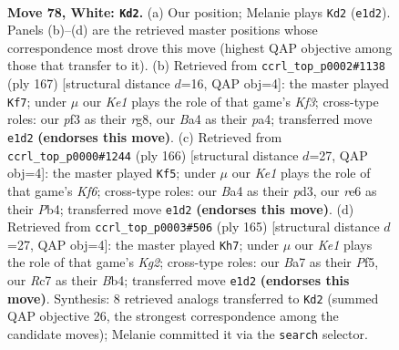 \documentclass[11pt]{article}
\begin{document}
\clearpage

\begin{figure}[p]\centering
\begin{subfigure}{0.46\textwidth}\centering
\resizebox{\linewidth}{!}{%
\newchessgame
\chessboard[
  setfen={7k/B1R5/4r3/8/B3p2p/5p1P/b4P2/4K3 w - - 66 78},
  showmover=false,
  pgfstyle=straightmove, color=movearrow, markmove={e1-d2}
]}
\caption{}
\end{subfigure}\hfill
\begin{subfigure}{0.46\textwidth}\centering
\resizebox{\linewidth}{!}{%
\newchessgame
\chessboard[
  setfen={6R1/8/1K3k2/p4p2/Pb1r4/5B1P/6P1/8 b - - 70 84},
  showmover=false,
  pgfstyle=straightmove, color=movearrow, markmove={f6-f7}
]}
\caption{}
\end{subfigure}
\\[4pt]
\begin{subfigure}{0.46\textwidth}\centering
\resizebox{\linewidth}{!}{%
\newchessgame
\chessboard[
  setfen={8/4P3/p4K2/Pp1k3b/1P6/3p4/3B4/8 w - - 6 84},
  showmover=false,
  pgfstyle=straightmove, color=movearrow, markmove={f6-f5}
]}
\caption{}
\end{subfigure}\hfill
\begin{subfigure}{0.46\textwidth}\centering
\resizebox{\linewidth}{!}{%
\newchessgame
\chessboard[
  setfen={8/5pk1/8/5p1p/1b3P1P/1P4P1/4K1B1/8 b - - 30 83},
  showmover=false,
  pgfstyle=straightmove, color=movearrow, markmove={g7-h7}
]}
\caption{}
\end{subfigure}
\caption{\textbf{Move 78, White: \texttt{Kd2}.} (a) Our position; Melanie plays \texttt{Kd2} (\texttt{e1d2}). Panels (b)--(d) are the retrieved master positions whose correspondence most drove this move (highest QAP objective among those that transfer to it). (b) Retrieved from \texttt{ccrl\_top\_p0002\#1138} (ply 167) [structural distance $d$=16, QAP obj=4]: the master played \texttt{Kf7}; under $\mu$ our \emph{Ke1} plays the role of that game's \emph{Kf3}; cross-type roles: our \emph{p}f3 as their \emph{r}g8, our \emph{B}a4 as their \emph{p}a4; transferred move \texttt{e1d2} \textbf{(endorses this move)}. (c) Retrieved from \texttt{ccrl\_top\_p0000\#1244} (ply 166) [structural distance $d$=27, QAP obj=4]: the master played \texttt{Kf5}; under $\mu$ our \emph{Ke1} plays the role of that game's \emph{Kf6}; cross-type roles: our \emph{B}a4 as their \emph{p}d3, our \emph{r}e6 as their \emph{P}b4; transferred move \texttt{e1d2} \textbf{(endorses this move)}. (d) Retrieved from \texttt{ccrl\_top\_p0003\#506} (ply 165) [structural distance $d$=27, QAP obj=4]: the master played \texttt{Kh7}; under $\mu$ our \emph{Ke1} plays the role of that game's \emph{Kg2}; cross-type roles: our \emph{B}a7 as their \emph{P}f5, our \emph{R}c7 as their \emph{B}b4; transferred move \texttt{e1d2} \textbf{(endorses this move)}. Synthesis: 8 retrieved analogs transferred to \texttt{Kd2} (summed QAP objective 26, the strongest correspondence among the candidate moves); Melanie committed it via the \texttt{search} selector.}
\label{fig:thought-m154}
\end{figure}
\end{document}

